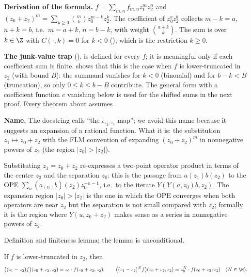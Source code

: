 \begin{dictionary}
\textbf{Derivation of the formula.} $f = \sum_{m,n}f_{m,n}z_1^mz_2^n$ and $(z_0+z_2)^m = \sum_{k\ge0}\binom mkz_0^{m-k}z_2^k$. The
coefficient of $z_0^az_2^b$ collects $m-k = a$, $n+k = b$, i.e.\ $m = a+k$, $n = b-k$, with weight $\binom{a+k}{k}$. The sum
is over $k\in\Z$ with $C(\cdot,k) = 0$ for $k<0$ (), which is the restriction $k\ge0$.

\textbf{The junk-value trap} ().  is defined for every $f$; it is meaningful
only if each coefficient sum is finite.  shows that this is the case when $f$ is
lower-truncated in $z_2$ (with bound $B$): the summand vanishes for $k<0$ (binomial) and for $b-k<B$ (truncation),
so only $0\le k\le b-B$ contribute. The general form with a coefficient function $c$ vanishing below  is
used for the shifted sums in the next proof. Every theorem about  assumes .

\textbf{Name.} The docstring calls  ``the $\iota_{z_2,z_0}$ map''; we avoid this name because it suggests
an expansion of a rational function. What it is: the substitution $z_1\mapsto z_0+z_2$ with the FLM convention of
expanding $(z_0+z_2)^m$ in nonnegative powers of $z_2$ (the region $|z_0|>|z_2|$).
\end{dictionary}

\begin{physics}
Substituting $z_1 = z_0+z_2$ re-expresses a two-point operator product in terms of the centre $z_2$ and the
separation $z_0$: this is the passage from $a(z_1)b(z_2)$ to the OPE $\sum_n(a_{(n)}b)(z_2)z_0^{-n-1}$, i.e.\ to the
iterate $Y(Y(a,z_0)b,z_2)$. The expansion region $|z_0|>|z_2|$ is the one in which the OPE converges when
both operators are near $z_2$ but the separation is not small compared with $z_2$; formally it is the region where
$Y(u,z_0+z_2)$ makes sense as a series in nonnegative powers of $z_2$.
\end{physics}

\begin{status}
Definition and finiteness lemma; the lemma is unconditional.
\end{status}

\begin{theorem}\label{l01:thm:subst}
If $f$ is lower-truncated in $z_2$, then
\begin{equation*}
  \big((z_1-z_2)f\big)(z_0+z_2,z_2) = z_0\cdot f(z_0+z_2,z_2),\qquad
  \big((z_1-z_2)^Nf\big)(z_0+z_2,z_2) = z_0^N\cdot f(z_0+z_2,z_2)\quad(N\in\N).
\end{equation*}
\end{theorem}

